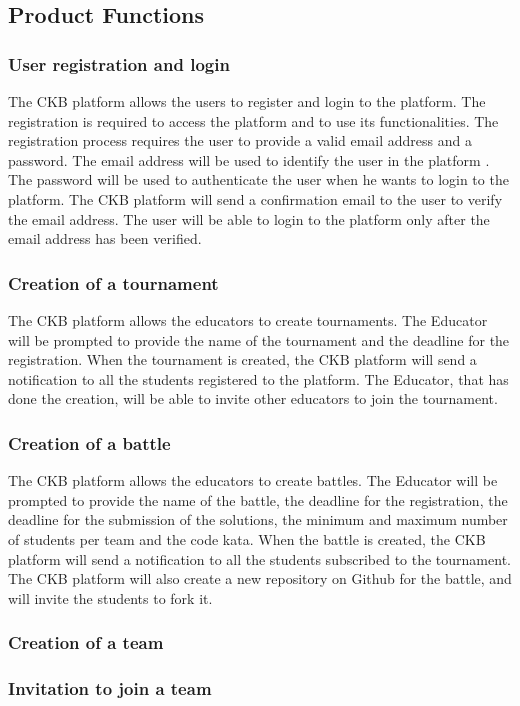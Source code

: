 \subsection{Product Functions}
\subsubsection{User registration and login}
The CKB platform allows the users to register and login to the platform. The registration is required to access the platform and to use its functionalities. The registration process requires the user to provide a valid email address and a password. The email address will be used to identify the user in the platform . The password will be used to authenticate the user when he wants to login to the platform. The CKB platform will send a confirmation email to the user to verify the email address. The user will be able to login to the platform only after the email address has been verified.
\subsubsection{Creation of a tournament}
The CKB platform allows the educators to create tournaments. The Educator will be prompted to provide the name of the tournament and the deadline for the registration. When the tournament is created, the CKB platform will send a notification to all the students registered to the platform. The Educator, that has done the creation, will be able to invite other educators to join the tournament.
\subsubsection{Creation of a battle}
The CKB platform allows the educators to create battles. The Educator will be prompted to provide the name of the battle, the deadline for the registration, the deadline for the submission of the solutions, the minimum and maximum number of students per team and the code kata. When the battle is created, the CKB platform will send a notification to all the students subscribed to the tournament. The CKB platform will also create a new repository on Github for the battle, and will invite the students to fork it.
\subsubsection{Creation of a team}
\subsubsection{Invitation to join a team}
